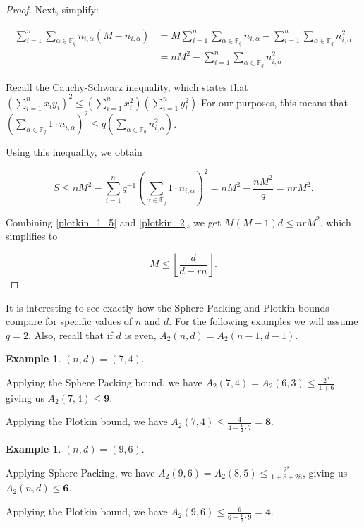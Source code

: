 \documentclass{article}
\theoremstyle{plain}
\theoremstyle{definition}
\newtheorem{exmp}[theorem]{Example}
\begin{document}
\begin{proof}
Next, simplify:

\begin{equation}
\begin{split}
\sum_{i=1}^{n} \sum_{\alpha\in\mathbb{F}_q} n_{i,\alpha}(M - n_{i,\alpha}) &= M\sum_{i=1}^{n} \sum_{\alpha\in\mathbb{F}_q} n_{i,\alpha} - \sum_{i=1}^{n} \sum_{\alpha\in\mathbb{F}_q} n_{i,\alpha}^2 \\
&= nM^2 - \sum_{i=1}^{n} \sum_{\alpha\in\mathbb{F}_q} n_{i,\alpha}^2
\end{split}
\end{equation}

Recall the Cauchy-Schwarz inequality, which states that $\left(\sum_{i=1}^n x_i y_i \right )^2 \le \left(\sum_{i=1}^n x_i^2 \right ) \left(\sum_{i=1}^n y_i^2 \right )$
For our purposes, this means that $\left(\sum_{\alpha\in\mathbb{F}_q} 1\cdot n_{i,\alpha} \right )^2 \le q \left(\sum_{\alpha\in\mathbb{F}_q} n_{i,\alpha}^2 \right )$.

Using this inequality, we obtain

\begin{equation} \label{plotkin_2}
S \le nM^2 - \sum_{i=1}^n q^{-1} \left(\sum_{\alpha\in\mathbb{F}_q} 1\cdot n_{i,\alpha} \right )^2 = nM^2 - \frac{nM^2}{q} = nrM^2.
\end{equation}

Combining \ref{plotkin_1_5} and \ref{plotkin_2}, we get $M(M-1)d \le nrM^2$, which simplifies to 

\begin{equation}
M \le \left\lfloor \frac{d}{d-rn} \right\rfloor.
\end{equation}

\end{proof}

It is interesting to see exactly how the Sphere Packing and Plotkin bounds compare for specific values of $n$ and $d$.  For the following examples we will assume $q=2$.    
Also, recall that if $d$ is even, $A_2(n,d) = A_2(n-1,d-1)$.  

\begin{exmp}
$(n,d) = (7,4)$.

Applying the Sphere Packing bound, we have $A_2(7,4) = A_2(6,3) \le \frac{2^6}{1 + 6}$, 
giving us $A_2(7,4) \le \textbf{9}$.

Applying the Plotkin bound, we have $A_2(7,4) \le \frac{4}{4-\frac{1}{2}\cdot7} = \textbf{8}$.

\end{exmp}

\begin{exmp}
$(n,d) = (9,6)$.

Applying Sphere Packing, we have  $A_2(9,6) = A_2(8,5) \le \frac{2^8}{1+8+28}$, giving us $A_2(n,d) \le \textbf{6}$.

Applying the Plotkin bound, we have $A_2(9,6) \le \frac{6}{6-\frac{1}{2}\cdot9} = \textbf{4}$.
\end{exmp}
\end{document}
